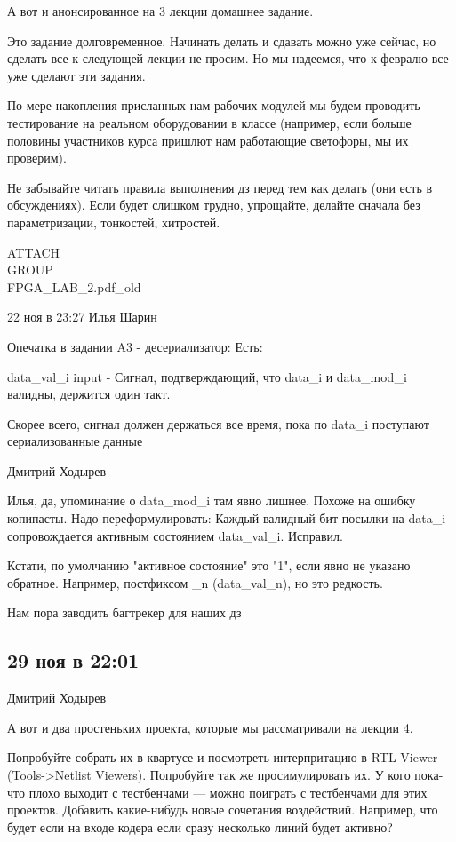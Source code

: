 \documentclass[a4paper, 12pt]{extarticle}
\begin{document}

А вот и анонсированное на 3 лекции домашнее задание.

Это задание долговременное. Начинать делать и сдавать можно уже сейчас, но сделать все к следующей лекции не просим. Но мы надеемся, что к февралю все уже сделают эти задания.

По мере накопления присланных нам рабочих модулей мы будем проводить тестирование на реальном оборудовании в классе (например, если больше половины участников курса пришлют нам работающие светофоры, мы их проверим).

Не забывайте читать правила выполнения дз перед тем как делать (они есть в обсуждениях). Если будет слишком трудно, упрощайте, делайте сначала без параметризации, тонкостей, хитростей.

ATTACH\\GROUP\\FPGA\_LAB\_2.pdf\_old

22 ноя в 23:27
Илья Шарин

Опечатка в задании A3 - десериализатор:
Есть:

data\_val\_i input - Сигнал, подтверждающий, что data\_i и
data\_mod\_i валидны, держится один такт.

Скорее всего, сигнал должен держаться все время, пока по data\_i поступают сериализованные данные

Дмитрий Ходырев

Илья, да, упоминание о data\_mod\_i там явно лишнее. Похоже на ошибку копипасты. Надо переформулировать: Каждый валидный бит посылки на data\_i сопровождается активным состоянием data\_val\_i. Исправил.

Кстати, по умолчанию "активное состояние" это "1", если явно не указано обратное. Например, постфиксом \_n (data\_val\_n), но это редкость.

Нам пора заводить багтрекер для наших дз

\subsection{29 ноя в 22:01}

Дмитрий Ходырев

А вот и два простеньких проекта, которые мы рассматривали на лекции 4.

Попробуйте собрать их в квартусе и посмотреть интерпритацию в RTL Viewer (Tools->Netlist Viewers). Попробуйте так же просимулировать их. У кого пока-что плохо выходит с тестбенчами — можно поиграть с тестбенчами для этих проектов. Добавить какие-нибудь новые сочетания воздействий. Например, что будет если на входе кодера если сразу несколько линий будет активно?
\end{document}
